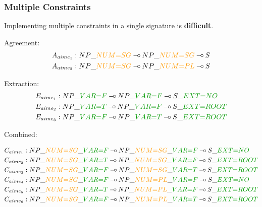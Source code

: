 \documentclass{beamer}
\def\limp {\mathbin{{-}\mkern-3.5mu{\circ}}}
\begin{document}
\begin{frame}
  \frametitle{Multiple Constraints}

  Implementing multiple constraints in a single signature is
  \textbf{difficult}.

  Agreement:
    \begin{align*}
      A_{aime_1} &: NP\_\textcolor{darkgold}{NUM{=}SG} \limp NP\_\textcolor{darkgold}{NUM{=}SG} \limp S \\
      A_{aime_2} &: NP\_\textcolor{darkgold}{NUM{=}SG} \limp NP\_\textcolor{darkgold}{NUM{=}PL} \limp S
    \end{align*}

  Extraction:
    \begin{align*}
      E_{aime_1} &: NP\_\textcolor{darkgreen}{VAR{=}F} \limp NP\_\textcolor{darkgreen}{VAR{=}F} \limp S\_\textcolor{darkgreen}{EXT{=}NO} \\
      E_{aime_2} &: NP\_\textcolor{darkgreen}{VAR{=}T} \limp NP\_\textcolor{darkgreen}{VAR{=}F} \limp S\_\textcolor{darkgreen}{EXT{=}ROOT} \\
      E_{aime_3} &: NP\_\textcolor{darkgreen}{VAR{=}F} \limp NP\_\textcolor{darkgreen}{VAR{=}T} \limp S\_\textcolor{darkgreen}{EXT{=}ROOT}
    \end{align*}

  Combined:
  \begin{small}
  \begin{align*}
      C_{aime_1} &: NP\_\textcolor{darkgold}{NUM{=}SG}\_\textcolor{darkgreen}{VAR{=}F} \limp NP\_\textcolor{darkgold}{NUM{=}SG}\_\textcolor{darkgreen}{VAR{=}F} \limp S\_\textcolor{darkgreen}{EXT{=}NO} \\
      C_{aime_2} &: NP\_\textcolor{darkgold}{NUM{=}SG}\_\textcolor{darkgreen}{VAR{=}T} \limp NP\_\textcolor{darkgold}{NUM{=}SG}\_\textcolor{darkgreen}{VAR{=}F} \limp S\_\textcolor{darkgreen}{EXT{=}ROOT} \\
      C_{aime_3} &: NP\_\textcolor{darkgold}{NUM{=}SG}\_\textcolor{darkgreen}{VAR{=}F} \limp NP\_\textcolor{darkgold}{NUM{=}SG}\_\textcolor{darkgreen}{VAR{=}T} \limp S\_\textcolor{darkgreen}{EXT{=}ROOT} \\
      C_{aime_4} &: NP\_\textcolor{darkgold}{NUM{=}SG}\_\textcolor{darkgreen}{VAR{=}F} \limp NP\_\textcolor{darkgold}{NUM{=}PL}\_\textcolor{darkgreen}{VAR{=}F} \limp S\_\textcolor{darkgreen}{EXT{=}NO} \\
      C_{aime_5} &: NP\_\textcolor{darkgold}{NUM{=}SG}\_\textcolor{darkgreen}{VAR{=}T} \limp NP\_\textcolor{darkgold}{NUM{=}PL}\_\textcolor{darkgreen}{VAR{=}F} \limp S\_\textcolor{darkgreen}{EXT{=}ROOT} \\
      C_{aime_6} &: NP\_\textcolor{darkgold}{NUM{=}SG}\_\textcolor{darkgreen}{VAR{=}F} \limp NP\_\textcolor{darkgold}{NUM{=}PL}\_\textcolor{darkgreen}{VAR{=}T} \limp S\_\textcolor{darkgreen}{EXT{=}ROOT}
  \end{align*}
  \end{small}
\end{frame}

\setcounter{framenumber}{\value{finalframe}}
\end{document}
